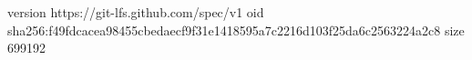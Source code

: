 version https://git-lfs.github.com/spec/v1
oid sha256:f49fdcacea98455cbedaecf9f31e1418595a7c2216d103f25da6c2563224a2c8
size 699192
